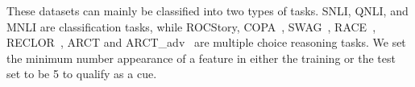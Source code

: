 These datasets can mainly be classified into two types of tasks. 
SNLI, QNLI, and MNLI are classification tasks, while 
ROCStory, COPA~\cite{roemmele2011choice}, SWAG~\cite{zellers2018swag}, 
RACE~\cite{lai2017race}, 
RECLOR~\cite{yu2020reclor}, %
ARCT and ARCT\_adv~\cite{schuster2019towards} are
multiple choice reasoning tasks. 
We set the minimum number appearance of a feature
in either the training or the test set to be 5 to qualify as a cue.

%
%
%
%
%
